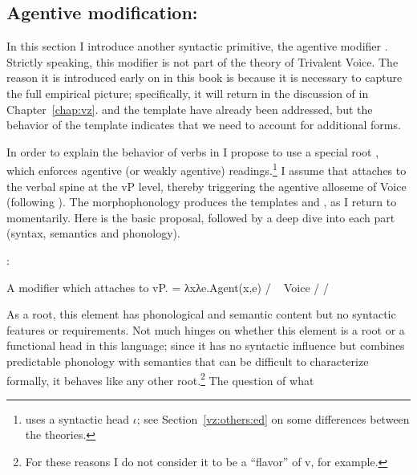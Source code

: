 \begin{exe}
\begin{xlist}
\begin{exe}
\begin{xlist}
\begin{exe}
\begin{xlist}
\begin{exe}
\begin{exe}
\begin{xlist}
\begin{exe}
\begin{xlist}
\begin{exe}
\begin{xlist}
\begin{exe}
\begin{xlist}
\begin{exe}
\begin{xlist}
\begin{exe}
\begin{xlist}
\begin{exe}
\begin{xlist}
\begin{exe}
\begin{xlist}
\begin{exe}
\begin{xlist}
\begin{exe}
\begin{xlist}
\begin{exe}
\begin{xlist}
\begin{exe}
\begin{xlist}
\begin{exe}
\begin{xlist}
\begin{exe}
\begin{exe}
\begin{xlist}
\begin{exe}
\begin{xlist}
\begin{exe}
\begin{xlist}
\begin{exe}
\begin{xlist}
\begin{exe}
\begin{xlist}
\begin{exe}
\begin{xlist}
\begin{exe}
\begin{xlist}
\begin{exe}
\begin{xlist}
\begin{xlist}
\begin{xlist}
\begin{exe}
\begin{xlist}
\begin{xlist}
\begin{xlist}
\begin{exe}
\begin{exe}
\begin{xlist}
\begin{exe}
\begin{xlist}
\begin{exe}
\begin{xlist}
\begin{exe}
\begin{xlist}
\begin{exe}
\begin{xlist}
\begin{exe}
\begin{xlist}
\begin{exe}
\begin{xlist}
\begin{exe}
\begin{exe}
\begin{xlist}
\begin{xlist}
\begin{exe}
\begin{xlist}
\begin{exe}
\begin{xlist}
\begin{exe}
\begin{xlist}
\begin{exe}
\begin{xlist}
\section{Agentive modification: \va} \label{voice:va}
In this section I introduce another syntactic primitive, the agentive modifier {\va}. Strictly speaking, this modifier is not part of the theory of Trivalent Voice. The reason it is introduced early on in this book is because it is necessary to capture the full empirical picture; specifically, it will return in the discussion of {\vz} in Chapter~\ref{chap:vz}.  and the template {\tkal} have already been addressed, but the behavior of the template {\tpie} indicates that we need to account for additional forms.

In order to explain the behavior of verbs in {\tpie} I propose to use a special root {\va}, which enforces agentive (or weakly agentive) readings.\footnote{\cite{doron03} uses a syntactic head $\iota$; see Section~\ref{vz:others:ed} on some differences between the theories.} I assume that {\va} attaches to the verbal spine at the vP level, thereby triggering the agentive alloseme of Voice (following \citealt{doron03,doron14adj}). The morphophonology produces the templates {\tpie} and {\thit}, as I return to momentarily. Here is the basic proposal, followed by a deep dive into each part (syntax, semantics and phonology).
 \begin{exe}
 \ex  {\va}: 
 \begin{xlist} 
 	\ex   A modifier which attaches to vP. 
 	\ex   {} = λxλe.Agent(x,e) / \trace~\va 
 	\ex   Voice {\lra} {\tpie} / {\trace} {\va} 
 	\ex   {\vz} {\lra} {\thit} / {\trace} {\va} 
 \z
\z 

As a root, this element has phonological and semantic content but no syntactic features or requirements. Not much hinges on whether this element is a root or a functional head in this language; since it has no syntactic influence but combines predictable phonology with semantics that can be difficult to characterize formally, it behaves like any other root.\footnote{For these reasons I do not consider it to be a ``flavor'' of v, for example.} The question of what 
\end{xlist}
\end{exe}
\end{xlist}
\end{exe}
\end{xlist}
\end{exe}
\end{xlist}
\end{exe}
\end{xlist}
\end{exe}
\end{xlist}
\end{xlist}
\end{exe}
\end{exe}
\end{xlist}
\end{exe}
\end{xlist}
\end{exe}
\end{xlist}
\end{exe}
\end{xlist}
\end{exe}
\end{xlist}
\end{exe}
\end{xlist}
\end{exe}
\end{xlist}
\end{exe}
\end{exe}
\end{xlist}
\end{xlist}
\end{xlist}
\end{exe}
\end{xlist}
\end{xlist}
\end{xlist}
\end{exe}
\end{xlist}
\end{exe}
\end{xlist}
\end{exe}
\end{xlist}
\end{exe}
\end{xlist}
\end{exe}
\end{xlist}
\end{exe}
\end{xlist}
\end{exe}
\end{xlist}
\end{exe}
\end{exe}
\end{xlist}
\end{exe}
\end{xlist}
\end{exe}
\end{xlist}
\end{exe}
\end{xlist}
\end{exe}
\end{xlist}
\end{exe}
\end{xlist}
\end{exe}
\end{xlist}
\end{exe}
\end{xlist}
\end{exe}
\end{xlist}
\end{exe}
\end{xlist}
\end{exe}
\end{xlist}
\end{exe}
\end{xlist}
\end{exe}
\end{xlist}
\end{exe}
\end{exe}
\end{xlist}
\end{exe}
\end{xlist}
\end{exe}
\end{xlist}
\end{exe}
